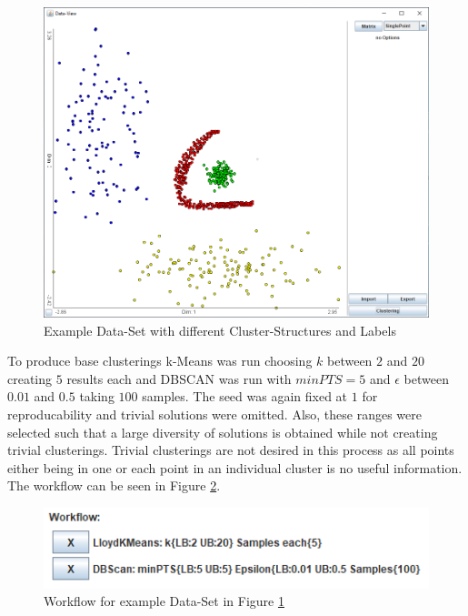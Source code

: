 \documentclass[
	a4paper,
	english,
	twoside,
	openright,               
	11pt                            
	]{report}
\begin{document}
\begin{figure}[h]
	\centering
	\includegraphics[scale=.4]{unob}
	\caption{Example Data-Set with different Cluster-Structures and Labels}
	\label{fig:unob}
\end{figure}

To produce base clusterings k-Means was run choosing $k$ between $2$ and $20$ creating $5$ results each and DBSCAN was run with $minPTS=5$ and $\epsilon$ between $0.01$ and $0.5$ taking $100$ samples. The seed was again fixed at $1$  for reproducability and trivial solutions were omitted. Also, these ranges were selected such that a large diversity of solutions is obtained while not creating trivial clusterings. Trivial clusterings are not desired in this process as all points either being in one or each point in an individual cluster is no useful information. The workflow can be seen in Figure \ref{fig:unob_wf}.

\begin{figure}[h]
	\centering
	\includegraphics[scale=.75]{unob_wf}
	\caption{Workflow for example Data-Set in Figure \ref{fig:unob}}
	\label{fig:unob_wf}
\end{figure}
\end{document}
